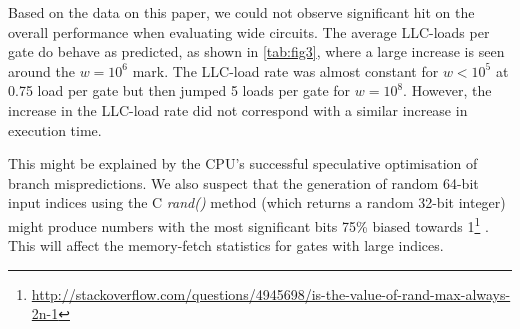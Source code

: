 Based on the data on this paper, we could not observe significant hit on the overall performance when evaluating wide circuits. The average LLC-loads per gate do behave as predicted, as shown in \ref{tab:fig3}, where a large increase is seen around the $w = 10^6$ mark. The LLC-load rate was almost constant for $w < 10^5 $ at 0.75 load per gate but then jumped 5 loads per gate for $w = 10^8$. However, the increase in the LLC-load rate did not correspond with a similar increase in execution time. 
\par
This might be explained by the CPU's successful speculative optimisation of branch mispredictions. We also suspect that the generation of random 64-bit input indices using the C \textit{rand()} method (which returns a random 32-bit integer) might produce numbers with the most significant bits 75\% biased towards 1\footnote{\url{http://stackoverflow.com/questions/4945698/is-the-value-of-rand-max-always-2n-1}}
. This will affect the memory-fetch statistics for gates with large indices.

